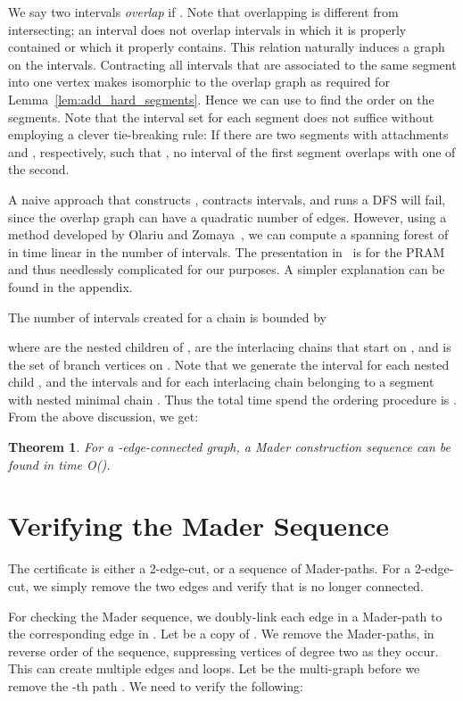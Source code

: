 \documentclass[paper=a4]{scrartcl}
\newtheorem{theorem}{Theorem}
\begin{document}
We say two intervals  \emph{overlap} if . Note that overlapping is different from intersecting; an interval does not overlap intervals in which it is properly contained or which it properly contains. This relation naturally induces a graph  on the intervals. Contracting all intervals that are associated to the same segment into one vertex makes  isomorphic to the overlap graph as required for Lemma~\ref{lem:add_hard_segments}. Hence we can use  to find the order on the segments. Note that the interval set  for each segment does not suffice without employing a clever tie-breaking rule: If there are two segments with attachments  and , respectively, such that , no interval of the first segment overlaps with one of the second.

A naive approach that constructs , contracts intervals, and runs a DFS will fail, since the overlap graph can have a quadratic number of edges. However, using a method developed by Olariu and Zomaya~\cite{Olariu1996}, we can compute a spanning forest of  in time linear in the number of intervals. The presentation in~\cite{Olariu1996} is for the PRAM and thus needlessly complicated for our purposes. A simpler explanation can be found in the appendix.

The number of intervals created for a chain  is bounded by

where  are the nested children of ,  are the interlacing chains that start on , and  is the set of branch vertices on . Note that we generate 
the interval  for each nested child , and the intervals  and  for each interlacing chain  belonging to a segment with nested minimal chain . Thus the total time spend the ordering procedure is . 
From the above discussion, we get:

\begin{theorem}
For a -edge-connected graph, a Mader construction sequence can be found in time O().
\end{theorem}


\section{Verifying the Mader Sequence}\label{sec:verify mader}

The certificate is either a 2-edge-cut, or a sequence of Mader-paths. For a 2-edge-cut, we simply remove the two edges and verify that  is no longer connected.

For checking the Mader sequence, we doubly-link each edge in a Mader-path to the corresponding edge in . Let  be a copy of . We remove the Mader-paths, in reverse order of the sequence, suppressing vertices of degree two as they occur. This can create multiple edges and loops. Let  be the multi-graph before we remove the -th path . We need to verify the following:
\end{document}
